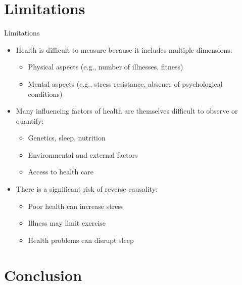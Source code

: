 \documentclass[
  11pt,
  ignorenonframetext,
]{beamer}
\providecommand{\tightlist}{%
  \setlength{\itemsep}{0pt}\setlength{\parskip}{0pt}}
\begin{document}
\section{Limitations}\label{limitations}

\begin{frame}{Limitations}
\begin{itemize}
\tightlist
\item
  Health is difficult to measure because it includes multiple
  dimensions:

  \begin{itemize}
  \tightlist
  \item
    Physical aspects (e.g., number of illnesses, fitness)
  \item
    Mental aspects (e.g., stress resistance, absence of psychological
    conditions)
  \end{itemize}
\item
  Many influencing factors of health are themselves difficult to observe
  or quantify:

  \begin{itemize}
  \tightlist
  \item
    Genetics, sleep, nutrition
  \item
    Environmental and external factors
  \item
    Access to health care
  \end{itemize}
\item
  There is a significant risk of reverse causality:

  \begin{itemize}
  \tightlist
  \item
    Poor health can increase stress
  \item
    Illness may limit exercise
  \item
    Health problems can disrupt sleep
  \end{itemize}
\end{itemize}
\end{frame}

\section{Conclusion}\label{conclusion}
\end{document}
